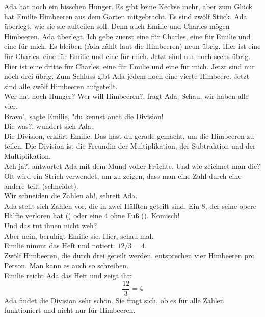 Ada hat noch ein bisschen Hunger.
Es gibt keine Keckse mehr, aber zum Glück hat Emilie Himbeeren aus dem Garten mitgebracht.
Es sind zwölf Stück. Ada überlegt, wie sie sie aufteilen soll. 
Denn auch Emilie und Charles mögen Himbeeren. 
Ada überlegt. Ich gebe zuerst eine für Charles, eine für Emilie und eine für mich. 
Es bleiben (Ada zählt laut die Himbeeren) neun übrig. 
Hier ist eine für Charles, eine für Emilie und eine für mich. Jetzt sind nur noch sechs übrig. 
Hier ist eine dritte für Charles, eine für Emilie und eine für mich. Jetzt sind nur noch drei übrig. 
Zum Schluss gibt Ada jedem noch eine vierte Himbeere. Jetzt sind alle zwölf Himbeeren aufgeteilt.\\
\frqq{}Wer hat noch Hunger? Wer will Himbeeren?\flqq{}, fragt Ada. \frqq{}Schau, wir haben alle vier.\frqq{}\\
\frqq{}Bravo", sagte Emilie, "du kennst auch die Division!\flqq{}\\
\frqq{}Die was?\flqq{}, wundert sich Ada.\\
\frqq{}Die Division\flqq{}, erklärt Emilie. \frqq{}Das hast du gerade gemacht, um die Himbeeren zu teilen. Die Division ist die Freundin der Multiplikation, der Subtraktion und der Multiplikation.\flqq{}\\
\frqq{}Ach ja?\flqq{}, antwortet Ada mit dem Mund voller Früchte. \frqq{}Und wie zeichnet man die?\flqq{}\\
\frqq{}Oft wird ein Strich verwendet, um zu zeigen, dass man eine Zahl durch eine andere teilt (schneidet).\flqq{}\\ 
\frqq{}Wir schneiden die Zahlen ab!\flqq{}, schreit Ada.\\
Ada stellt sich Zahlen vor, die in zwei Hälften geteilt sind. Ein $8$, der seine obere Hälfte verloren hat () oder eine $4$ ohne Fuß (). Komisch!\flqq{}\\
\frqq{}Und das tut ihnen nicht weh?\flqq{}\\
\frqq{}Aber nein\flqq{}, beruhigt Emilie sie. \frqq{}Hier, schau mal.\flqq{}\\
Emilie nimmt das Heft und notiert: $12/3=4$.\\
\frqq{}Zwölf Himbeeren, die durch drei geteilt werden, entsprechen vier Himbeeren pro Person. Man kann es auch so schreiben.\flqq{}\\
Emilie reicht Ada das Heft und zeigt ihr: 
$$\frac{12}{3}=4$$
Ada findet die Division sehr schön. Sie fragt sich, ob es für alle Zahlen funktioniert und nicht nur für Himbeeren. 
